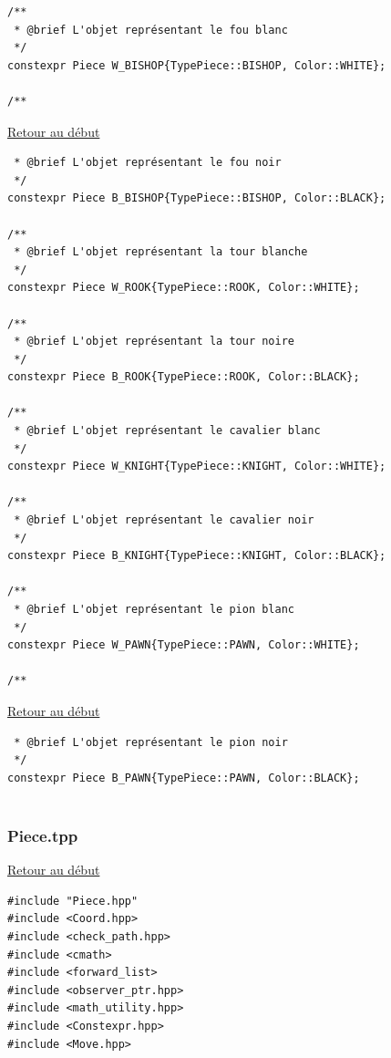 {\begin{frame}[fragile]
\begin{verbatim}
/**
 * @brief L'objet représentant le fou blanc
 */
constexpr Piece W_BISHOP{TypePiece::BISHOP, Color::WHITE};

/**
\end{verbatim}
\end{frame}

\begin{frame}[fragile]
\hyperlink{conclusion}{Retour au début}\newline
\begin{verbatim}
 * @brief L'objet représentant le fou noir
 */
constexpr Piece B_BISHOP{TypePiece::BISHOP, Color::BLACK};

/**
 * @brief L'objet représentant la tour blanche
 */
constexpr Piece W_ROOK{TypePiece::ROOK, Color::WHITE};

/**
 * @brief L'objet représentant la tour noire
 */
constexpr Piece B_ROOK{TypePiece::ROOK, Color::BLACK};

/**
 * @brief L'objet représentant le cavalier blanc
 */
constexpr Piece W_KNIGHT{TypePiece::KNIGHT, Color::WHITE};

/**
 * @brief L'objet représentant le cavalier noir
 */
constexpr Piece B_KNIGHT{TypePiece::KNIGHT, Color::BLACK};

/**
 * @brief L'objet représentant le pion blanc
 */
constexpr Piece W_PAWN{TypePiece::PAWN, Color::WHITE};

/**
\end{verbatim}
\end{frame}

\begin{frame}[fragile]
\hyperlink{conclusion}{Retour au début}\newline
\begin{verbatim}
 * @brief L'objet représentant le pion noir
 */
constexpr Piece B_PAWN{TypePiece::PAWN, Color::BLACK};


\end{verbatim}
\end{frame}

\begin{frame}[fragile]
\label{Piece.tpp}
\frametitle{Piece.tpp}
\hyperlink{conclusion}{Retour au début}\newline
\begin{verbatim}
#include "Piece.hpp"
#include <Coord.hpp>
#include <check_path.hpp>
#include <cmath>
#include <forward_list>
#include <observer_ptr.hpp>
#include <math_utility.hpp>
#include <Constexpr.hpp>
#include <Move.hpp>


\end{verbatim}
\end{frame}}
